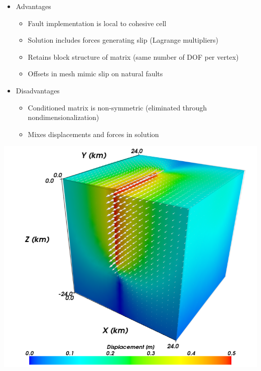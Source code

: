 \documentclass[pdftex,cig,slideColor]{pp4slides}
\begin{document}
 
 \begin{itemize}
 \item Advantages
   \begin{itemize}
   \item Fault implementation is local to cohesive cell
   \item Solution includes forces generating slip (Lagrange multipliers)
   \item Retains block structure of matrix (same number of DOF per vertex)
   \item Offsets in mesh mimic slip on natural faults
   \end{itemize}
 \item Disadvantages 
   \begin{itemize}
   \item Conditioned matrix is non-symmetric (eliminated through
     nondimensionalization)
   \item Mixes displacements and forces in solution
   \end{itemize}
 \end{itemize}
  

  \vfill
  \begin{center}
    \includegraphics[scale=0.6]{figs/benchmark_soln}
  \end{center}
  
\end{document}
